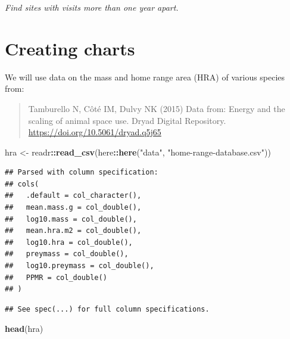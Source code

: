 \documentclass[]{Nemilov}
\newenvironment{Shaded}{\begin{snugshade}}{\end{snugshade}}
\newcommand{\KeywordTok}[1]{\textcolor[rgb]{0.13,0.29,0.53}{\textbf{#1}}}
\newcommand{\NormalTok}[1]{#1}
\newcommand{\OperatorTok}[1]{\textcolor[rgb]{0.81,0.36,0.00}{\textbf{#1}}}
\newcommand{\StringTok}[1]{\textcolor[rgb]{0.31,0.60,0.02}{#1}}
\begin{document}
\emph{Find sites with visits more than one year apart.}

\hypertarget{creating-charts}{%
\section{Creating charts}\label{creating-charts}}

We will use data on the mass and home range area (HRA) of various species from:

\begin{quote}
Tamburello N, Côté IM, Dulvy NK (2015) Data from: Energy and the scaling of animal space use. Dryad Digital Repository.
\url{https://doi.org/10.5061/dryad.q5j65}
\end{quote}

\begin{Shaded}
\begin{Highlighting}[]
\NormalTok{hra <-}\StringTok{ }\NormalTok{readr}\OperatorTok{::}\KeywordTok{read_csv}\NormalTok{(here}\OperatorTok{::}\KeywordTok{here}\NormalTok{(}\StringTok{"data"}\NormalTok{, }\StringTok{"home-range-database.csv"}\NormalTok{))}
\end{Highlighting}
\end{Shaded}

\begin{verbatim}
## Parsed with column specification:
## cols(
##   .default = col_character(),
##   mean.mass.g = col_double(),
##   log10.mass = col_double(),
##   mean.hra.m2 = col_double(),
##   log10.hra = col_double(),
##   preymass = col_double(),
##   log10.preymass = col_double(),
##   PPMR = col_double()
## )
\end{verbatim}

\begin{verbatim}
## See spec(...) for full column specifications.
\end{verbatim}

\begin{Shaded}
\begin{Highlighting}[]
\KeywordTok{head}\NormalTok{(hra)}
\end{Highlighting}
\end{Shaded}
\end{document}
